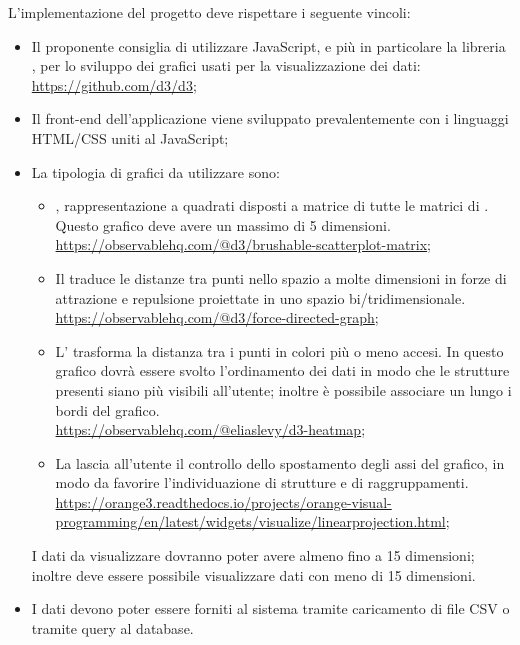 \documentclass[../analisi-dei-requisiti.tex]{subfiles}
\begin{document}
L'implementazione del progetto deve rispettare i seguente vincoli:
\begin{itemize}
    \item Il proponente consiglia di utilizzare JavaScript, e più in particolare la libreria , per lo sviluppo dei grafici usati per la visualizzazione dei dati: \\ \url{https://github.com/d3/d3};
    \item Il front-end dell'applicazione viene sviluppato prevalentemente con i linguaggi HTML/CSS uniti al JavaScript;
    \item La tipologia di grafici da utilizzare sono:
    \begin{itemize}
        \item {}, rappresentazione a quadrati disposti a matrice di tutte le matrici di . Questo grafico deve avere un massimo di 5 dimensioni. \\ \url{https://observablehq.com/@d3/brushable-scatterplot-matrix};
        \item Il  traduce le distanze tra punti nello spazio a molte dimensioni in forze di attrazione e repulsione proiettate in uno spazio bi/tridimensionale. \\  \url{https://observablehq.com/@d3/force-directed-graph};
        \item L' trasforma la distanza tra i punti in colori più o meno accesi. In questo grafico dovrà essere svolto l'ordinamento dei dati in modo che le strutture presenti siano più visibili all'utente; inoltre è possibile associare un  lungo i bordi del grafico. \\ \url{https://observablehq.com/@eliaslevy/d3-heatmap}; 
        \item La  lascia all'utente il controllo dello spostamento degli assi del grafico, in modo da favorire l'individuazione di strutture e di raggruppamenti. \\ \url{https://orange3.readthedocs.io/projects/orange-visual-programming/en/latest/widgets/visualize/linearprojection.html};
    \end{itemize}
    I dati da visualizzare dovranno poter avere almeno fino a 15 dimensioni; inoltre deve essere possibile visualizzare dati con meno di 15 dimensioni. 
    \item I dati devono poter essere forniti al sistema tramite caricamento di file CSV o tramite query al database.
\end{itemize}
\end{document}
